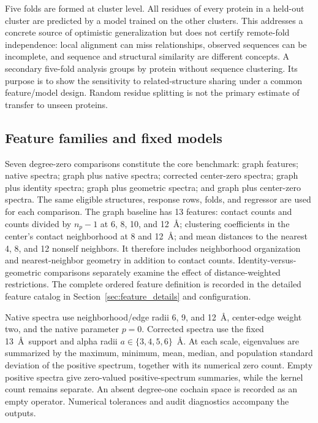 \documentclass[11pt]{article}
\begin{document}
Five folds are formed at cluster level. All residues of every protein in a held-out cluster are predicted by a model trained on the other clusters. This addresses a concrete source of optimistic generalization but does not certify remote-fold independence: local alignment can miss relationships, observed sequences can be incomplete, and sequence and structural similarity are different concepts. A secondary five-fold analysis groups by protein without sequence clustering. Its purpose is to show the sensitivity to related-structure sharing under a common feature/model design. Random residue splitting is not the primary estimate of transfer to unseen proteins.


\subsection{Feature families and fixed models}
Seven degree-zero comparisons constitute the core benchmark: graph features; native spectra; graph plus native spectra; corrected center-zero spectra; graph plus identity spectra; graph plus geometric spectra; and graph plus center-zero spectra. The same eligible structures, response rows, folds, and regressor are used for each comparison. The graph baseline has 13 features: contact counts and counts divided by $n_p-1$ at 6, 8, 10, and 12~\AA; clustering coefficients in the center's contact neighborhood at 8 and 12~\AA; and mean distances to the nearest 4, 8, and 12 nonself neighbors. It therefore includes neighborhood organization and nearest-neighbor geometry in addition to contact counts. Identity-versus-geometric comparisons separately examine the effect of distance-weighted restrictions. The complete ordered feature definition is recorded in the detailed feature catalog in Section~\ref{sec:feature_details} and configuration.

Native spectra use neighborhood/edge radii 6, 9, and 12~\AA, center-edge weight two, and the native parameter $p=0$. Corrected spectra use the fixed 13~\AA\ support and alpha radii $a\in\{3,4,5,6\}$~\AA. At each scale, eigenvalues are summarized by the maximum, minimum, mean, median, and population standard deviation of the positive spectrum, together with its numerical zero count. Empty positive spectra give zero-valued positive-spectrum summaries, while the kernel count remains separate. An absent degree-one cochain space is recorded as an empty operator. Numerical tolerances and audit diagnostics accompany the outputs.
\end{document}
